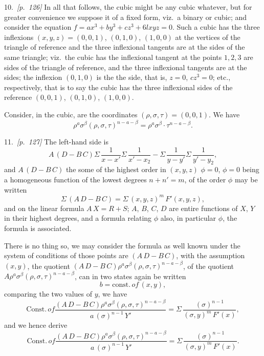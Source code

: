 \documentclass[11pt,a4paper]{book}
\begin{document}
10.\ \textit{[p.~126]} In all that follows, the cubic might be any cubic whatever, but for greater convenience we suppose it of a fixed form, viz.\ a binary or cubic; and consider the equation $f = ax^3 + by^3 + cz^3 + 6lxyz = 0$. Such a cubic has the three inflexions $(x, y, z) = (0, 0, 1)$, $(0, 1, 0)$, $(1, 0, 0)$ at the vertices of the triangle of reference and the three inflexional tangents are at the sides of the same triangle; viz.\ the cubic has the inflexional tangent at the points $1, 2, 3$ are sides of the triangle of reference, and the three inflexional tangents are at the sides; the inflexion $(0, 1, 0)$ is the the side, that is, $z = 0$, $cz^3 = 0$; etc., respectively, that is to say the cubic has the three inflexional sides of the reference $(0, 0, 1)$, $(0, 1, 0)$, $(1, 0, 0)$.

Consider, in the cubic, are the coordinates $(\rho, \sigma, \tau) = (0, 0, 1)$. We have
\[
\rho^a \sigma^\beta (\rho, \sigma, \tau)^{n - a - \beta} = \rho^a \sigma^\beta \cdot \tau^{n - a - \beta}.
\]

11.\ \textit{[p.~127]} The left-hand side is
\[
A\,(D - B\,C)\Sigma\,\frac{1}{x - x'}\Sigma\,\frac{1}{x' - x_2} - \Sigma\,\frac{1}{y - y'}\Sigma\,\frac{1}{y' - y_2},
\]
and $A\,(D - B\,C)$ the some of the highest order in $(x, y, z)$ $\phi = 0$, $\phi = 0$ being a homogeneous function of the lowest degrees $n + n' = m$, of the order $\phi$ may be written
\[
\Sigma\,(A\,D - B\,C) = \Sigma\,(x, y, z)^{m}\,F'(x, y, z),
\]
and on the linear formula $A\,X = R + S$; $A$, $B$, $C$, $D$ are entire functions of $X$, $Y$ in their highest degrees, and a formula relating $\phi$ also, in particular $\phi$, the formula is associated.

There is no thing so, we may consider the formula as well known under the system of conditions of those points are $(A\,D - B\,C)$, with the assumption $(x, y)$, the quotient $(A\,D - B\,C)\rho^a \sigma^\beta (\rho, \sigma, \tau)^{n - a - \beta}$, of the quotient $A\rho^a \sigma^\beta (\rho, \sigma, \tau)^{n - a - \beta}$, can in two states again be written
\[
b = \text{const.}\,of\,(x, y),
\]
comparing the two values of $y$, we have
\[
\text{Const.}\,of\frac{(A\,D - B\,C)\rho^a \sigma^\beta (\rho, \sigma, \tau)^{n - a - \beta}}{a\,(\sigma)^{n - 1}\,Y'} = \Sigma\,\frac{(\sigma)^{n - 1}}{(\sigma, y)^{m}\,F'(x)},
\]
and we hence derive
\[
\text{Const.}\,of\frac{(A\,D - B\,C)\rho^a \sigma^\beta (\rho, \sigma, \tau)^{n - a - \beta}}{a\,(\sigma)^{n - 1}\,Y'} = \Sigma\,\frac{(\sigma)^{n - 1}}{(\sigma, y)^{m}\,F'(x)}.
\]
\end{document}
